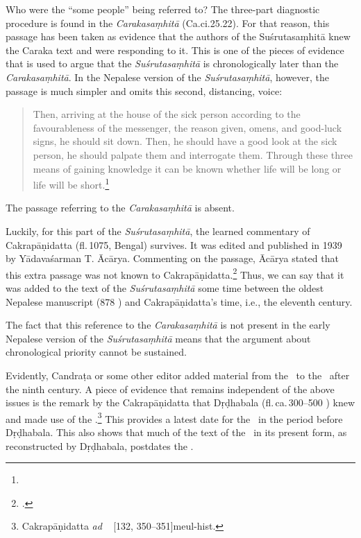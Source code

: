 Who were the “some people” being referred to? The three-part
diagnostic procedure is found in the \emph{Carakasaṃhitā}
(Ca.ci.25.22). For that reason, this passage has been taken as
evidence that the authors of the Suśrutasaṃhitā knew the Caraka text
and were responding to it. This is one of the pieces of evidence that
is used to argue that the \emph{Suśrutasaṃhitā} is chronologically
later than the \emph{Carakasaṃhitā}. In the Nepalese version of the
\emph{Suśrutasaṃhitā}, however, the passage is much simpler and omits
this second, distancing, voice:
\begin{quote}
    Then, arriving at the house of the sick person according to the favourableness of 
the messenger, the reason given, omens, and good-luck signs, he should sit down. 
Then, he should have a good look at the sick person, he should palpate them and 
interrogate them. Through these three means of gaining knowledge it can be 
known whether life will be long or life will be short.\footnote{}
\end{quote}
The passage referring to the \emph{Carakasaṃhitā} is absent.

Luckily, for this part of the \emph{Suśrutasaṃhitā}, the learned commentary of 
Cakrapāṇidatta (fl.\,1075, Bengal) survives. It was edited and
published in 1939 by
Yādavaśarman T. Ācārya. Commenting on the passage, Ācārya stated that this 
extra passage was not known to Cakrapāṇidatta.\footnote{.}
Thus, we can say that it was added to the text of the
\emph{Suśrutasaṃhitā} some time between the oldest Nepalese manuscript
(878 \CE) and Cakrapāṇidatta’s time, i.e., the eleventh century.

The fact that this reference to the \emph{Carakasaṃhitā} is not
present in the early Nepalese version of the \emph{Suśrutasaṃhitā}
means that the argument about chronological priority cannot be
sustained.

Evidently, Candraṭa or some other editor added material from the
\CS\ to the \SS\ after the ninth century. A piece of evidence that
remains independent of the above issues is the remark by the
Cakrapāṇidatta  that
Dṛḍhabala (fl.\,ca.\,300--500 \CE) knew and made use of the
\SS.\footnote{Cakrapāṇidatta \emph{ad} \CS\ 
    [132, 350--351]{meul-hist}.}  This provides a latest date
    for the \SS\ in the period before Dṛḍhabala.  This also shows that
    much of the text of the \CS\ in its present form, as reconstructed
    by Dṛḍhabala, postdates the \SS.
   
